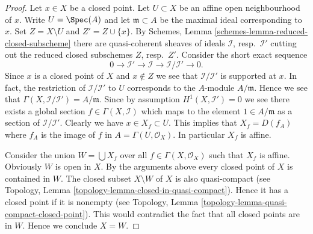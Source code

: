 \begin{proof}
Let $x \in X$ be a closed point. Let $U \subset X$ be an affine open
neighbourhood of $x$. Write $U = \Spec(A)$ and let
$\mathfrak m \subset A$ be the maximal ideal corresponding to $x$.
Set $Z = X \setminus U$ and $Z' = Z \cup \{x\}$.
By Schemes, Lemma \ref{schemes-lemma-reduced-closed-subscheme} there
are quasi-coherent sheaves of ideals
$\mathcal{I}$, resp.\ $\mathcal{I}'$ cutting out
the reduced closed subschemes $Z$, resp.\ $Z'$.
Consider the short exact sequence
$$
0 \to \mathcal{I}' \to \mathcal{I} \to \mathcal{I}/\mathcal{I}' \to 0.
$$
Since $x$ is a closed point of $X$ and $x \not \in Z$ we see that
$\mathcal{I}/\mathcal{I}'$ is supported at $x$. In fact, the restriction
of $\mathcal{I}/\mathcal{I'}$ to $U$ corresponds to the $A$-module
$A/\mathfrak m$. Hence we see that $\Gamma(X, \mathcal{I}/\mathcal{I'})
= A/\mathfrak m$. Since by assumption $H^1(X, \mathcal{I}') = 0$
we see there exists a global section $f \in \Gamma(X, \mathcal{I})$
which maps to the element $1 \in A/\mathfrak m$ as a section of
$\mathcal{I}/\mathcal{I'}$. Clearly we have
$x \in X_f \subset U$. This implies that $X_f = D(f_A)$ where
$f_A$ is the image of $f$ in $A = \Gamma(U, \mathcal{O}_X)$.
In particular $X_f$ is affine.

\medskip\noindent
Consider the union $W = \bigcup X_f$ over all $f \in \Gamma(X, \mathcal{O}_X)$
such that $X_f$ is affine. Obviously $W$ is open in $X$.
By the arguments above every closed point of
$X$ is contained in $W$. The closed subset $X \setminus W$ of $X$
is also quasi-compact
(see Topology, Lemma \ref{topology-lemma-closed-in-quasi-compact}).
Hence it has a closed point if it is nonempty (see
Topology, Lemma \ref{topology-lemma-quasi-compact-closed-point}).
This would contradict the fact that all closed points are in
$W$. Hence we conclude $X = W$.


\end{proof}
